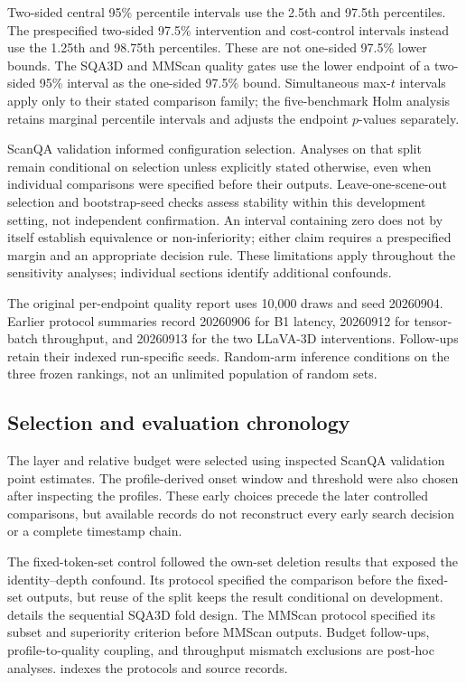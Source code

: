 Two-sided central 95\% percentile intervals use the 2.5th and 97.5th percentiles. The prespecified two-sided 97.5\% intervention and cost-control intervals instead use the 1.25th and 98.75th percentiles. These are not one-sided 97.5\% lower bounds. The SQA3D and MMScan quality gates use the lower endpoint of a two-sided 95\% interval as the one-sided 97.5\% bound. Simultaneous max-$t$ intervals apply only to their stated comparison family; the five-benchmark Holm analysis retains marginal percentile intervals and adjusts the endpoint $p$-values separately.

ScanQA validation informed configuration selection. Analyses on that split remain conditional on selection unless explicitly stated otherwise, even when individual comparisons were specified before their outputs. Leave-one-scene-out selection and bootstrap-seed checks assess stability within this development setting, not independent confirmation. An interval containing zero does not by itself establish equivalence or non-inferiority; either claim requires a prespecified margin and an appropriate decision rule. These limitations apply throughout the sensitivity analyses; individual sections identify additional confounds.

The original per-endpoint quality report uses 10,000 draws and seed 20260904. Earlier protocol summaries record 20260906 for B1 latency, 20260912 for tensor-batch throughput, and 20260913 for the two LLaVA-3D interventions. Follow-ups retain their indexed run-specific seeds. Random-arm inference conditions on the three frozen rankings, not an unlimited population of random sets.

\subsection{Selection and evaluation chronology}
\label{sec:supp_selection}

The layer and relative budget were selected using inspected ScanQA validation point estimates. The profile-derived onset window and threshold were also chosen after inspecting the profiles. These early choices precede the later controlled comparisons, but available records do not reconstruct every early search decision or a complete timestamp chain.

The fixed-token-set control followed the own-set deletion results that exposed the identity--depth confound. Its protocol specified the comparison before the fixed-set outputs, but reuse of the split keeps the result conditional on development.  details the sequential SQA3D fold design. The MMScan protocol specified its subset and superiority criterion before MMScan outputs. Budget follow-ups, profile-to-quality coupling, and throughput mismatch exclusions are post-hoc analyses.  indexes the protocols and source records.
